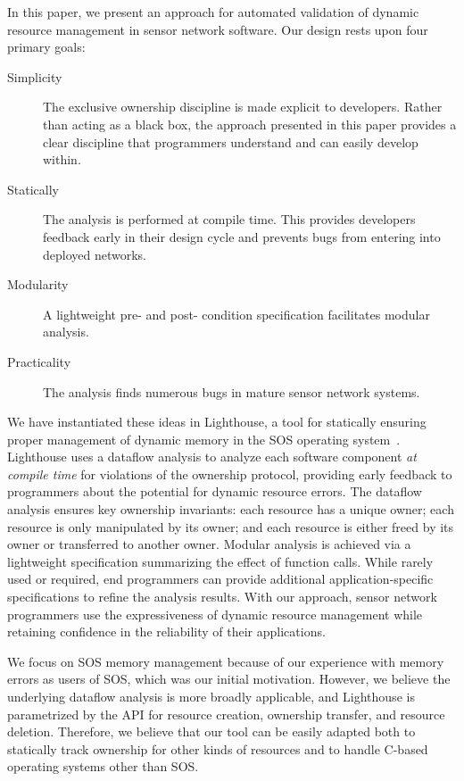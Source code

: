 In this paper, we present an approach for automated validation of dynamic
resource management in sensor network software.  
%
Our design rests upon four primary goals:
%
\begin{description}
%
\item[Simplicity]  The exclusive ownership discipline is made explicit to
developers.
%
Rather than acting as a black box, the approach presented in this paper
provides a clear discipline that programmers understand and can easily
develop within.
%
\item[Statically] The analysis is performed at compile time.  This provides
developers feedback early in their design cycle and prevents bugs from
entering into deployed networks.
%
\item[Modularity]  A lightweight pre- and post- condition specification
facilitates modular analysis.
%
\item[Practicality] The analysis finds numerous bugs in mature sensor
network systems.
%
\end{description}



We have instantiated these ideas in Lighthouse, a tool for statically
ensuring proper management of dynamic memory in the SOS operating
system~\cite{sos}.  
%
Lighthouse uses a dataflow analysis to analyze each software component {\em
at compile time} for violations of the ownership protocol, providing early
feedback to programmers about the potential for dynamic resource errors.  
%
The dataflow analysis ensures key ownership invariants:  each resource has a
unique owner; each resource is only manipulated by its owner; and each
resource is either freed by its owner or transferred to another owner.  
%
Modular analysis is achieved via a lightweight specification summarizing the
effect of function calls.
%
While rarely used or required, end programmers can provide additional
application-specific specifications to refine the analysis results.
%
With our approach, sensor network programmers use the expressiveness of
dynamic resource management while retaining confidence in the reliability of
their applications.



We focus on SOS memory management because of our experience with memory
errors as users of SOS, which was our initial motivation.  
%
However, we believe the underlying dataflow analysis is more broadly
applicable, and Lighthouse is parametrized by the API for resource creation,
ownership transfer, and resource deletion.  
%
Therefore, we believe that our tool can be easily adapted both to statically
track ownership for other kinds of resources and to handle C-based operating
systems other than SOS.



